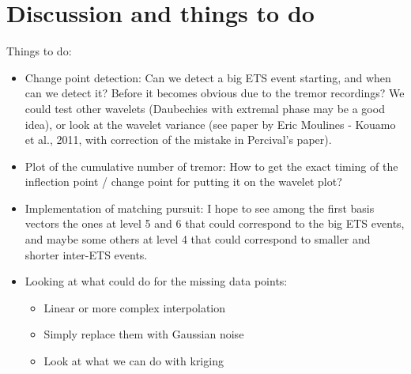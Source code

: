 \documentclass[main.tex]{subfiles}
\begin{document}
\chapter{Discussion and things to do}

Things to do:

\begin{itemize}

\item Change point detection: Can we detect a big ETS event starting, and when can we detect it? Before it becomes obvious due to the tremor recordings? We could test other wavelets (Daubechies with extremal phase may be a good idea), or look at the wavelet variance (see paper by Eric Moulines - Kouamo et al., 2011, with correction of the mistake in Percival's paper).

\item Plot of the cumulative number of tremor: How to get the exact timing of the inflection point / change point for putting it on the wavelet plot?

\item Implementation of matching pursuit: I hope to see among the first basis vectors the ones at level 5 and 6 that could correspond to the big ETS events, and maybe some others at level 4 that could correspond to smaller and shorter inter-ETS events.

\item Looking at what could do for the missing data points:
\begin{itemize}
	\item Linear or more complex interpolation
	\item Simply replace them with Gaussian noise
	\item Look at what we can do with kriging
\end{itemize}

\end{itemize}
\end{document}
